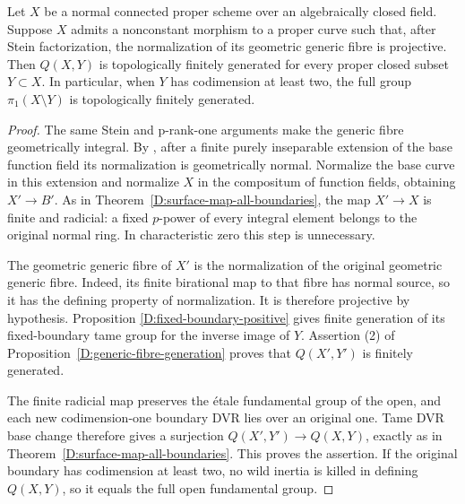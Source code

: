\begin{corollary}
\label{D:projective-generic-normalization}
Let $X$ be a normal connected proper scheme over an
algebraically closed field.  Suppose $X$ admits a
nonconstant morphism to a proper curve such that, after
Stein factorization, the normalization of its geometric
generic fibre is projective.  Then $Q(X,Y)$ is
topologically finitely generated for every proper closed
subset $Y\subset X$.  In particular, when $Y$ has
codimension at least two, the full group
$\pi_1(X\setminus Y)$ is topologically finitely generated.
\end{corollary}
\begin{proof}
The same Stein and p-rank-one arguments make the generic
fibre geometrically integral.  By
\cite[Lemma 33.27.4, tag 0BXT]{C_StacksLogFibration}, after
a finite purely inseparable extension of the base function
field its normalization is geometrically normal.  Normalize
the base curve in this extension and normalize $X$ in the
compositum of function fields, obtaining $X'\to B'$.
As in Theorem~\ref{D:surface-map-all-boundaries}, the map
$X'\to X$ is finite and radicial: a fixed $p$-power of
every integral element belongs to the original normal
ring.  In characteristic zero this step is unnecessary.

The geometric generic fibre of $X'$ is the normalization
of the original geometric generic fibre.  Indeed, its
finite birational map to that fibre has normal source,
so it has the defining property of normalization.  It is
therefore projective by hypothesis.  Proposition
\ref{D:fixed-boundary-positive} gives finite generation
of its fixed-boundary tame group for the inverse image
of $Y$.  Assertion (2) of
Proposition~\ref{D:generic-fibre-generation} proves that
$Q(X',Y')$ is finitely generated.

The finite radicial map preserves the \'etale fundamental
group of the open, and each new codimension-one boundary
DVR lies over an original one.  Tame DVR base change
therefore gives a surjection $Q(X',Y')\to Q(X,Y)$,
exactly as in Theorem~\ref{D:surface-map-all-boundaries}.
This proves the assertion.  If the original boundary
has codimension at least two, no wild inertia is killed
in defining $Q(X,Y)$, so it equals the full open
fundamental group.
\end{proof}
